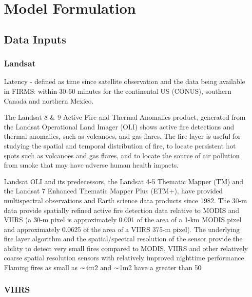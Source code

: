 \documentclass[preprint,review, 11pt,3p,authoryear]{elsarticle}
\begin{document}
\section{Model Formulation}
\label{model}



\subsection{Data Inputs}



\subsubsection{Landsat}
Latency - defined as time since satellite observation and the data being available in FIRMS:
within 30-60 minutes for the continental US (CONUS), southern Canada and northern Mexico.

The Landsat 8 & 9 Active Fire and Thermal Anomalies product, generated from the Landsat Operational Land Imager (OLI) shows active fire detections and thermal anomalies, such as volcanoes, and gas flares. The fire layer is useful for studying the spatial and temporal distribution of fire, to locate persistent hot spots such as volcanoes and gas flares, and to locate the source of air pollution from smoke that may have adverse human health impacts.

Landsat OLI and its predecessors, the Landsat 4-5 Thematic Mapper (TM) and the Landsat 7 Enhanced Thematic Mapper Plus (ETM+), have provided multispectral observations and Earth science data products since 1982. The 30-m data provide spatially refined active fire detection data relative to MODIS and VIIRS (a 30-m pixel is approximately 0.001 of the area of a 1-km MODIS pixel and approximately 0.0625 of the area of a VIIRS 375-m pixel). The underlying fire layer algorithm and the spatial/spectral resolution of the sensor provide the ability to detect very small fires compared to MODIS, VIIRS and other relatively coarse spatial resolution sensors with relatively improved nighttime performance. Flaming fires as small as ∼4m2 and ∼1m2 have a greater than 50%
\subsubsection{VIIRS}
\end{document}
